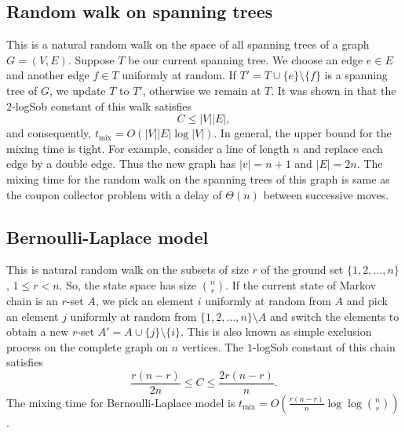 \documentclass[11pt]{amsart}
\newcommand{\tm}{t_{\mathrm{mix}}}
\newcommand{\1}{\mathbf{1}}
\theoremstyle{definition}
\theoremstyle{plain}
\theoremstyle{remark}
\numberwithin{equation}{section}
\begin{document}
\subsection{Random walk on spanning trees}\label{subsec:spanning} This is a natural random walk on the space of all spanning trees of  a graph $G = (V, E)$. Suppose $T$ be our current spanning tree. We choose an edge $e \in E$ and another edge $f \in T$ uniformly at random. If $T' = T \cup \{ e\} \setminus \{f\}$ is a spanning tree of $G$, we update $T$ to $T'$, otherwise we remain at $T$. It was shown in \cite{Jerrum02} that the $2$-logSob constant of this walk satisfies
\[ C \le |V| |E|, \]
and consequently, $\tm = O(|V| |E| \log |V|)$.  In general, the upper bound for the mixing time is tight. For example, consider a line of length $n$ and replace each edge by a double edge. Thus the new graph has $|v| = n+1$ and $|E| = 2n$. The mixing time for the random walk on the spanning trees of this graph is same as the coupon collector problem with a delay of $\Theta(n)$ between successive moves.


\subsection{Bernoulli-Laplace model}\label{subsec:BL} This is natural random walk on the subsets of size $r$ of the ground set $\{1, 2, \ldots, n\}$, $1 \le r < n$. So, the state space has size ${ n \choose r}$. If the current state of Markov chain is an $r$-set $A$, we pick an element $i$ uniformly at random from $A$ and pick an element $j$ uniformly at random from $\{1,2,\ldots, n\} \setminus A$ and switch the elements to obtain a new $r$-set $A' = A \cup \{ j\} \setminus \{i\}$. This is also known as simple exclusion process on the complete graph on $n$ vertices. The $1$-logSob constant of this chain satisfies \cite{Quastel03, BT03, Goel04}
\[  \frac{r(n-r)}{2n} \le C \le \frac{2r(n-r)}{n}.\]
The mixing time for Bernoulli-Laplace model is $\tm = O( \frac{r (n-r)}{n} \log \log { n \choose r}  )$.
\end{document}
